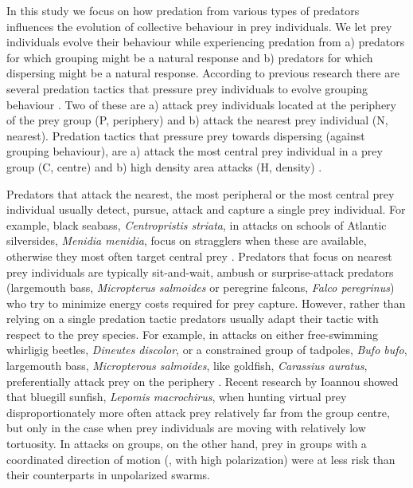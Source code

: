 In this study we focus on how predation from various types of predators influences the evolution of collective behaviour in prey individuals. We let prey individuals evolve their behaviour while experiencing predation from a) predators for which grouping might be a natural response and b) predators for which dispersing might be a natural response. According to previous research there are several predation tactics that pressure prey individuals to evolve grouping behaviour \cite{biswas2014causes,kunz2006prey,olson2013predator,olson2016evolution}. Two of these are a) attack prey individuals located at the periphery of the prey group (P, periphery) and b) attack the nearest prey individual (N, nearest). Predation tactics that pressure prey towards dispersing (against grouping behaviour), are a) attack the most central prey individual in a prey group (C, centre) and b) high density area attacks (H, density) \cite{olson2013predator}. 

Predators that attack the nearest, the most peripheral or the most central prey individual usually detect, pursue, attack and capture a single prey individual. For example, black seabass, \emph{Centropristis striata}, in attacks on schools of Atlantic silversides, \emph{Menidia menidia}, focus on stragglers when these are available, otherwise they most often target central prey \cite{parrish1989reexamining}. Predators that focus on nearest prey individuals are typically sit-and-wait, ambush or surprise-attack predators (\eg largemouth bass, \emph{Micropterus salmoides} \cite{savino1982predatorprey} or peregrine falcons, \emph{Falco peregrinus}\cite{zoratto2010aerial}) who try to minimize energy costs required for prey capture. However, rather than relying on a single predation tactic predators usually adapt their tactic with respect to the prey species. For example, in attacks on either free-swimming whirligig beetles, \emph{Dineutes discolor}, or a constrained group of tadpoles, \emph{Bufo bufo}, largemouth bass, \emph{Micropterous salmoides}, like goldfish, \emph{Carassius auratus}, preferentially attack prey on the periphery \cite{romey2008predators}. Recent research by Ioannou\etal \cite{ioannou2012predatory} showed that bluegill sunfish, \emph{Lepomis macrochirus}, when hunting virtual prey disproportionately more often attack prey relatively far from the group centre, but only in the case when prey individuals are moving with relatively low tortuosity. In attacks on groups, on the other hand, prey in groups with a coordinated direction of motion (\ie, with high polarization) were at less risk than their counterparts in unpolarized swarms.

